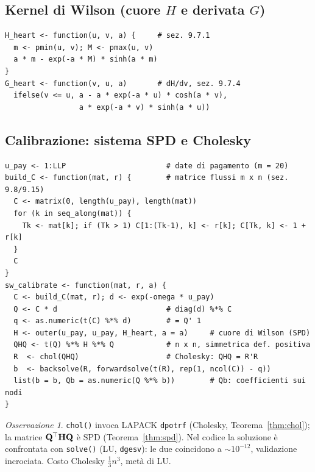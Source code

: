 \documentclass[11pt,a4paper]{article}
\theoremstyle{plain}
\theoremstyle{definition}
\theoremstyle{remark}
\newtheorem*{osservazione}{Osservazione}
\newcommand{\bfb}{\mathbf{b}}
\newcommand{\bfp}{\mathbf{p}}
\newcommand{\bfq}{\mathbf{q}}
\newcommand{\Hmat}{\mathbf{H}}
\newcommand{\Cmat}{\mathbf{C}}
\newcommand{\Qmat}{\mathbf{Q}}
\newcommand{\transp}{^{\mskip-1mu\top}}
\begin{document}
\subsection{Kernel di Wilson (cuore $H$ e derivata $G$)}

\begin{codebox}
\begin{Verbatim}[fontsize=\small]
H_heart <- function(u, v, a) {     # sez. 9.7.1
  m <- pmin(u, v); M <- pmax(u, v)
  a * m - exp(-a * M) * sinh(a * m)
}
G_heart <- function(v, u, a)       # dH/dv, sez. 9.7.4
  ifelse(v <= u, a - a * exp(-a * u) * cosh(a * v),
                 a * exp(-a * v) * sinh(a * u))
\end{Verbatim}
\end{codebox}

\subsection{Calibrazione: sistema SPD e Cholesky}

\begin{codebox}[Costruzione di $\Cmat,\Qmat$ e soluzione di $\Qmat\transp\Hmat\Qmat\,\bfb=\bfp-\bfq$]
\begin{Verbatim}[fontsize=\small]
u_pay <- 1:LLP                       # date di pagamento (m = 20)
build_C <- function(mat, r) {        # matrice flussi m x n (sez. 9.8/9.15)
  C <- matrix(0, length(u_pay), length(mat))
  for (k in seq_along(mat)) {
    Tk <- mat[k]; if (Tk > 1) C[1:(Tk-1), k] <- r[k]; C[Tk, k] <- 1 + r[k]
  }
  C
}
sw_calibrate <- function(mat, r, a) {
  C <- build_C(mat, r); d <- exp(-omega * u_pay)
  Q <- C * d                         # diag(d) %*% C
  q <- as.numeric(t(C) %*% d)        # = Q' 1
  H <- outer(u_pay, u_pay, H_heart, a = a)     # cuore di Wilson (SPD)
  QHQ <- t(Q) %*% H %*% Q            # n x n, simmetrica def. positiva
  R  <- chol(QHQ)                    # Cholesky: QHQ = R'R
  b  <- backsolve(R, forwardsolve(t(R), rep(1, ncol(C)) - q))
  list(b = b, Qb = as.numeric(Q %*% b))        # Qb: coefficienti sui nodi
}
\end{Verbatim}
\end{codebox}

\begin{osservazione}
\texttt{chol()} invoca LAPACK \texttt{dpotrf} (Cholesky, Teorema~\ref{thm:chol});
la matrice $\Qmat\transp\Hmat\Qmat$ è SPD (Teorema~\ref{thm:spd}). Nel codice la
soluzione è confrontata con \texttt{solve()} (LU, \texttt{dgesv}): le due coincidono
a $\sim 10^{-12}$, validazione incrociata. Costo Cholesky $\tfrac13 n^3$, metà di LU.
\end{osservazione}
\end{document}
